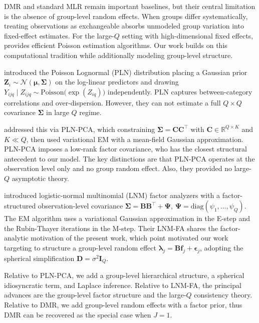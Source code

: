 DMR and standard MLR remain important baselines, but their central limitation is the absence of group-level random effects. When groups differ systematically, treating observations as exchangeable absorbs unmodeled group variation into fixed-effect estimates. For the large-$Q$ setting with high-dimensional fixed effects, \citet{Correia_2020} provides efficient Poisson estimation algorithms. Our work builds on this computational tradition while additionally modeling group-level structure.
 
\citet{Aitchison_1989} introduced the Poisson Lognormal (PLN) distribution placing a Gaussian prior $\bm{Z}_i \sim \mathcal{N}(\bm{\mu}, \bm{\Sigma})$ on the log-linear predictors and drawing $Y_{ijq} \mid Z_{ijq} \sim \mathrm{Poisson}\bigl(\exp(Z_{iq})\bigr)$ independently. PLN captures between-category correlations and over-dispersion. However, they can not  estimate a full $Q\times Q$ covariance $\bm{\Sigma}$ in large $Q$ regime.
 
\citet{chiquet2018variational} addressed this via PLN-PCA, which constraining $\bm{\Sigma} = \mathbf{CC}^\top$ with $\mathbf{C}\in\mathbb{R}^{Q\times K}$ and $K\ll Q$, then used variational EM with a mean-field Gaussian approximation. PLN-PCA imposes a low-rank factor covariance, who has the closest structural antecedent to our model. The key distinctions are that PLN-PCA operates at the observation level only and no group random effect. Also, they provided no large-$Q$ asymptotic theory.
 
\citet{Tu2023} introduced logistic-normal multinomial (LNM) factor analyzers with a factor-structured observation-level covariance $\bm{\Sigma} = \mathbf{BB}^{\top} + \bm{\Psi}$, $\bm{\Psi} = \mathrm{diag}(\psi_1,\ldots,\psi_Q)$. The EM algorithm uses a variational Gaussian approximation in the E-step and the Rubin-Thayer iterations \citep{Rubin1982} in the M-step. Their LNM-FA shares the factor-analytic motivation of the present work, which point motivated our work targeting to structure a group-level random effect $\bm{\lambda}_j = \mathbf{B}\mathbf{f}_j + \bm{\epsilon}_j$, adopting the spherical simplification $\mathbf{D} = \sigma^2\mathbf{I}_Q$. 

Relative to PLN-PCA, we add a group-level hierarchical structure, a spherical idiosyncratic term, and Laplace inference. Relative to LNM-FA, the principal advances are the group-level factor structure and the large-$Q$ consistency theory. Relative to DMR, we add group-level random effects with a factor prior, thus DMR can be recovered as the special case when $J = 1$.


